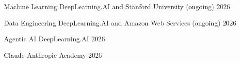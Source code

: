 
\begin{cvactivities}

  \cvactivity
    {Machine Learning}
    {DeepLearning.AI and Stanford University (ongoing)}
    {2026}

  \cvactivity
    {Data Engineering}
    {DeepLearning.AI and Amazon Web Services (ongoing)}
    {2026}

  \cvactivity
    {Agentic AI}
    {DeepLearning.AI}
    {2026}

  \cvactivity
    {Claude}
    {Anthropic Academy}
    {2026}


\end{cvactivities}
